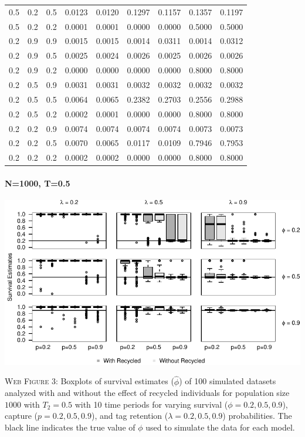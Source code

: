 \documentclass[]{article}
\let\oldparagraph\paragraph
\renewcommand{\paragraph}[1]{\oldparagraph{#1}\mbox{}}
\begin{document}
\begin{table}[ht]
{\begin{tabular}{rrrrrrrrr}
  0.5 & 0.2 & 0.5 & 0.0123 & 0.0120 & 0.1297 & 0.1157 & 0.1357 & 0.1197 \\ 
  0.5 & 0.2 & 0.2 & 0.0001 & 0.0001 & 0.0000 & 0.0000 & 0.5000 & 0.5000 \\ 
  0.2 & 0.9 & 0.9 & 0.0015 & 0.0015 & 0.0014 & 0.0311 & 0.0014 & 0.0312 \\ 
  0.2 & 0.9 & 0.5 & 0.0025 & 0.0024 & 0.0026 & 0.0025 & 0.0026 & 0.0026 \\ 
  0.2 & 0.9 & 0.2 & 0.0000 & 0.0000 & 0.0000 & 0.0000 & 0.8000 & 0.8000 \\ 
  0.2 & 0.5 & 0.9 & 0.0031 & 0.0031 & 0.0032 & 0.0032 & 0.0032 & 0.0032 \\ 
  0.2 & 0.5 & 0.5 & 0.0064 & 0.0065 & 0.2382 & 0.2703 & 0.2556 & 0.2988 \\ 
  0.2 & 0.5 & 0.2 & 0.0002 & 0.0001 & 0.0000 & 0.0000 & 0.8000 & 0.8000 \\ 
  0.2 & 0.2 & 0.9 & 0.0074 & 0.0074 & 0.0074 & 0.0074 & 0.0073 & 0.0073 \\ 
  0.2 & 0.2 & 0.5 & 0.0070 & 0.0065 & 0.0117 & 0.0109 & 0.7946 & 0.7953 \\ 
  0.2 & 0.2 & 0.2 & 0.0002 & 0.0002 & 0.0000 & 0.0000 & 0.8000 & 0.8000 \\ 
   \hline
\end{tabular}
}
\endgroup
\end{table}

\newpage

\paragraph{N=1000, T=0.5}\label{n1000-t0.5}

\includegraphics{Appendix_BW_files/figure-latex/figure3_survival_GJSTL4-1.pdf}

\textsc{Web Figure 3:} Boxplots of survival estimates (\(\hat{\phi}\))
of 100 simulated datasets analyzed with and without the effect of
recycled individuals for population size \(1000\) with \(T_2=0.5\) with
10 time periods for varying survival (\(\phi=0.2,0.5,0.9\)), capture
(\(p=0.2,0.5,0.9\)), and tag retention (\(\lambda=0.2,0.5,0.9\))
probabilities. The black line indicates the true value of \(\phi\) used
to simulate the data for each model.
\end{document}
